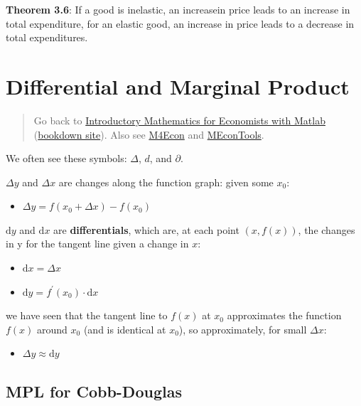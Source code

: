 \documentclass[
]{book}
\providecommand{\tightlist}{%
  \setlength{\itemsep}{0pt}\setlength{\parskip}{0pt}}
\begin{document}
\textbf{Theorem 3.6}: If a good is inelastic, an increasein price leads to an
increase in total expenditure, for an elastic good, an increase in price
leads to a decrease in total expenditures.

\hypertarget{differential-and-marginal-product}{%
\section{Differential and Marginal Product}\label{differential-and-marginal-product}}

\begin{quote}
Go back to \href{https://math4econ.github.io/}{Introductory Mathematics for Economists with Matlab} (\href{https://math4econ.github.io/bookdown}{bookdown site}). Also see \href{http://fanwangecon.github.io/M4Econ}{M4Econ} and \href{https://fanwangecon.github.io/MEconTools/}{MEconTools}.
\end{quote}

We often see these symbols: \(\Delta\), \(d\), and \(\partial\).

\(\Delta y\) and \(\Delta x\) are changes along the function graph: given
some \(x_0\):

\begin{itemize}
\tightlist
\item
  \(\displaystyle \Delta y=f(x_0 +\Delta x)-f(x_0 )\)
\end{itemize}

\(\textrm{d}y\) and \(\textrm{d}x\) are \textbf{differentials}, which are, at
each point \((x,f(x))\), the changes in y for the tangent line given a
change in \(x\):

\begin{itemize}
\item
  \(\displaystyle \textrm{d}x=\Delta x\)
\item
  \(\displaystyle \textrm{d}y=f^{\prime } (x_0 )\cdot \textrm{d}x\)
\end{itemize}

we have seen that the tangent line to \(f(x)\) at \(x_0\) approximates the
function \(f(x)\) around \(x_0\) (and is identical at \(x_0\)), so
approximately, for small \(\Delta x\):

\begin{itemize}
\tightlist
\item
  \(\displaystyle \Delta y\approx \textrm{d}y\)
\end{itemize}

\hypertarget{mpl-for-cobb-douglas}{%
\subsection{MPL for Cobb-Douglas}\label{mpl-for-cobb-douglas}}
\end{document}

